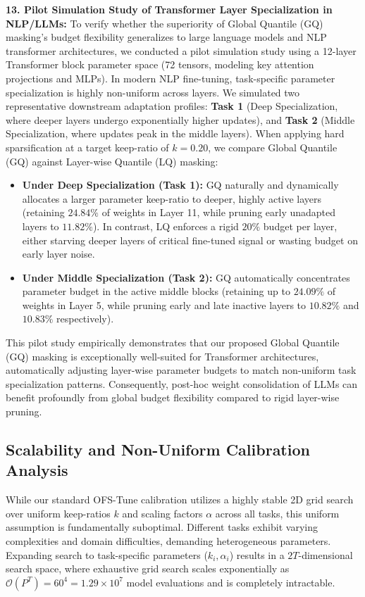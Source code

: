 \textbf{13. Pilot Simulation Study of Transformer Layer Specialization in NLP/LLMs:}
To verify whether the superiority of Global Quantile (GQ) masking's budget flexibility generalizes to large language models and NLP transformer architectures, we conducted a pilot simulation study using a 12-layer Transformer block parameter space (72 tensors, modeling key attention projections and MLPs). In modern NLP fine-tuning, task-specific parameter specialization is highly non-uniform across layers. We simulated two representative downstream adaptation profiles: \textbf{Task 1} (Deep Specialization, where deeper layers undergo exponentially higher updates), and \textbf{Task 2} (Middle Specialization, where updates peak in the middle layers). When applying hard sparsification at a target keep-ratio of $k=0.20$, we compare Global Quantile (GQ) against Layer-wise Quantile (LQ) masking:
\begin{itemize}
    \item \textbf{Under Deep Specialization (Task 1):} GQ naturally and dynamically allocates a larger parameter keep-ratio to deeper, highly active layers (retaining $24.84\%$ of weights in Layer 11, while pruning early unadapted layers to $11.82\%$). In contrast, LQ enforces a rigid $20\%$ budget per layer, either starving deeper layers of critical fine-tuned signal or wasting budget on early layer noise.
    \item \textbf{Under Middle Specialization (Task 2):} GQ automatically concentrates parameter budget in the active middle blocks (retaining up to $24.09\%$ of weights in Layer 5, while pruning early and late inactive layers to $10.82\%$ and $10.83\%$ respectively).
\end{itemize}
This pilot study empirically demonstrates that our proposed Global Quantile (GQ) masking is exceptionally well-suited for Transformer architectures, automatically adjusting layer-wise parameter budgets to match non-uniform task specialization patterns. Consequently, post-hoc weight consolidation of LLMs can benefit profoundly from global budget flexibility compared to rigid layer-wise pruning.


\subsection{Scalability and Non-Uniform Calibration Analysis}
\label{subsec:scalability}
While our standard OFS-Tune calibration utilizes a highly stable 2D grid search over uniform keep-ratios $k$ and scaling factors $\alpha$ across all tasks, this uniform assumption is fundamentally suboptimal. Different tasks exhibit varying complexities and domain difficulties, demanding heterogeneous parameters. Expanding search to task-specific parameters ($k_i, \alpha_i$) results in a $2T$-dimensional search space, where exhaustive grid search scales exponentially as $\mathcal{O}(P^T) = 60^4 = 1.29 \times 10^7$ model evaluations and is completely intractable.

